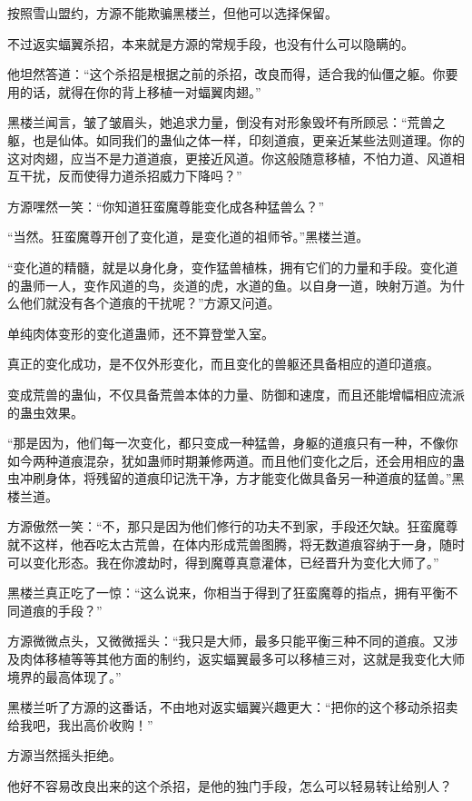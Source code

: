 \begin{this_body}
按照雪山盟约，方源不能欺骗黑楼兰，但他可以选择保留。

不过返实蝠翼杀招，本来就是方源的常规手段，也没有什么可以隐瞒的。

他坦然答道：“这个杀招是根据之前的杀招，改良而得，适合我的仙僵之躯。你要用的话，就得在你的背上移植一对蝠翼肉翅。”

黑楼兰闻言，皱了皱眉头，她追求力量，倒没有对形象毁坏有所顾忌：“荒兽之躯，也是仙体。如同我们的蛊仙之体一样，印刻道痕，更亲近某些法则道理。你的这对肉翅，应当不是力道道痕，更接近风道。你这般随意移植，不怕力道、风道相互干扰，反而使得力道杀招威力下降吗？”

方源嘿然一笑：“你知道狂蛮魔尊能变化成各种猛兽么？”

“当然。狂蛮魔尊开创了变化道，是变化道的祖师爷。”黑楼兰道。

“变化道的精髓，就是以身化身，变作猛兽植株，拥有它们的力量和手段。变化道的蛊师一人，变作风道的鸟，炎道的虎，水道的鱼。以自身一道，映射万道。为什么他们就没有各个道痕的干扰呢？”方源又问道。

单纯肉体变形的变化道蛊师，还不算登堂入室。

真正的变化成功，是不仅外形变化，而且变化的兽躯还具备相应的道印道痕。

变成荒兽的蛊仙，不仅具备荒兽本体的力量、防御和速度，而且还能增幅相应流派的蛊虫效果。

“那是因为，他们每一次变化，都只变成一种猛兽，身躯的道痕只有一种，不像你如今两种道痕混杂，犹如蛊师时期兼修两道。而且他们变化之后，还会用相应的蛊虫冲刷身体，将残留的道痕印记洗干净，方才能变化做具备另一种道痕的猛兽。”黑楼兰道。

方源傲然一笑：“不，那只是因为他们修行的功夫不到家，手段还欠缺。狂蛮魔尊就不这样，他吞吃太古荒兽，在体内形成荒兽图腾，将无数道痕容纳于一身，随时可以变化形态。我在你渡劫时，得到魔尊真意灌体，已经晋升为变化大师了。”

黑楼兰真正吃了一惊：“这么说来，你相当于得到了狂蛮魔尊的指点，拥有平衡不同道痕的手段？”

方源微微点头，又微微摇头：“我只是大师，最多只能平衡三种不同的道痕。又涉及肉体移植等等其他方面的制约，返实蝠翼最多可以移植三对，这就是我变化大师境界的最高体现了。”

黑楼兰听了方源的这番话，不由地对返实蝠翼兴趣更大：“把你的这个移动杀招卖给我吧，我出高价收购！”

方源当然摇头拒绝。

他好不容易改良出来的这个杀招，是他的独门手段，怎么可以轻易转让给别人？


\end{this_body}
